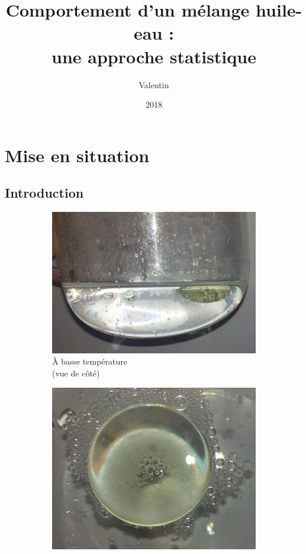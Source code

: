 \documentclass[french]{beamer}
\title[Comportement d'un mélange phénol-eau]{Comportement d'un mélange huile-eau :\\une approche statistique}
\author{Valentin \texorpdfstring{\bsc{Ogier}}{Ogier}}
\date{2018}
\begin{document}
\frame{\titlepage}

	
\section{Mise en situation}
\subsection{Introduction}

\begin{frame}
    \begin{figure}
        \centering
       	\begin{subfigure}{0.32\textwidth}
        	\centering
        	\includegraphics[height=0.3\textheight]{assets/bulle/bulle-profil.jpg}
        	\caption{\`A basse température\\(vue de côté)}
        \end{subfigure}
		\begin{subfigure}{0.32\textwidth}
			\centering
			\includegraphics[height=0.3\textheight]{assets/bulle/bulle-coloree.jpg}

\end{subfigure}
\end{figure}
\end{frame}
\end{document}
